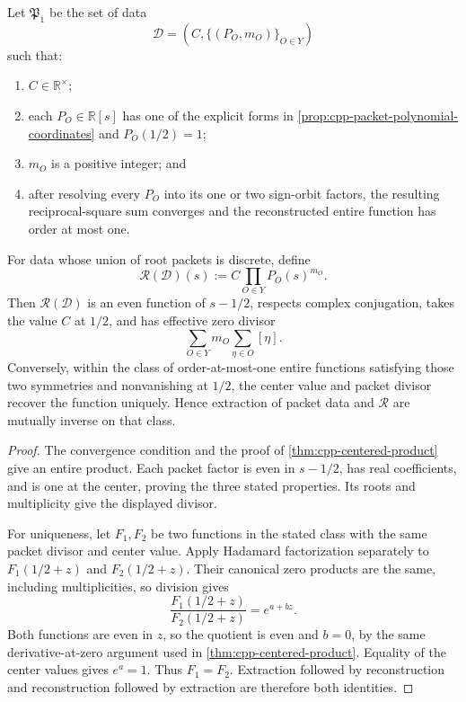 \begin{theorem}
\label{thm:cpp-reconstruction-map}
Let \(\mathfrak P_1\) be the set of data
\[
 \mathcal D=
 \left(C,\{(P_O,m_O)\}_{O\in Y}\right)
\]
such that:
\begin{enumerate}
\item \(C\in\mathbb R^\times\);
\item each \(P_O\in\mathbb R[s]\) has one of the explicit forms in
      \cref{prop:cpp-packet-polynomial-coordinates} and
      \(P_O(1/2)=1\);
\item \(m_O\) is a positive integer; and
\item after resolving every \(P_O\) into its one or two sign-orbit factors,
      the resulting reciprocal-square sum converges and the reconstructed
      entire function has order at most one.
\end{enumerate}
For data whose union of root packets is discrete, define
\begin{equation}
\label{eq:cpp-reconstruction-morphism}
 \mathcal R(\mathcal D)(s)
 :=
 C\prod_{O\in Y}P_O(s)^{m_O}.
\end{equation}
Then \(\mathcal R(\mathcal D)\) is an even function of \(s-1/2\), respects
complex conjugation, takes the value \(C\) at \(1/2\), and has effective zero
divisor
\[
 \sum_{O\in Y}m_O\sum_{\eta\in O}[\eta].
\]
Conversely, within the class of order-at-most-one entire functions satisfying
those two symmetries and nonvanishing at \(1/2\), the center value and packet
divisor recover the function uniquely.  Hence extraction of packet data and
\(\mathcal R\) are mutually inverse on that class.
\end{theorem}

\begin{proof}
The convergence condition and the proof of
\cref{thm:cpp-centered-product} give an entire product.  Each packet factor is
even in \(s-1/2\), has real coefficients, and is one at the center, proving the
three stated properties.  Its roots and multiplicity give the displayed
divisor.

For uniqueness, let \(F_1,F_2\) be two functions in the stated class with the
same packet divisor and center value.  Apply Hadamard factorization separately
to \(F_1(1/2+z)\) and \(F_2(1/2+z)\).  Their canonical zero products are the
same, including multiplicities, so division gives
\[
 \frac{F_1(1/2+z)}{F_2(1/2+z)}=e^{a+bz}.
\]
Both functions are even in \(z\), so the quotient is even and \(b=0\), by the
same derivative-at-zero argument used in
\cref{thm:cpp-centered-product}.  Equality of the center values gives
\(e^a=1\).  Thus \(F_1=F_2\).  Extraction followed by reconstruction and
reconstruction followed by extraction are therefore both identities.
\end{proof}


